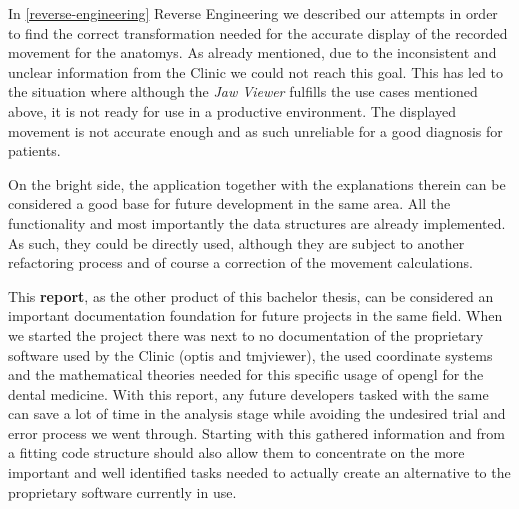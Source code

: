 In \ref{reverse-engineering} Reverse Engineering we described our attempts in order to find the correct transformation needed for the accurate display of the recorded movement for the \glspl{anatomy}. As already mentioned, due to the inconsistent and unclear information from the Clinic we could not reach this goal. This has led to the situation where although the \emph{Jaw Viewer} fulfills the use cases mentioned above, it is not ready for use in a productive environment. The displayed movement is not accurate enough and as such unreliable for a good diagnosis for patients.

On the bright side, the application together with the explanations therein can be considered a good base for future development in the same area. All the functionality and most importantly the data structures are already implemented. As such, they could be directly used, although they are subject to another refactoring process and of course a correction of the movement calculations. \newline

This \textbf{report}, as the other product of this bachelor thesis, can be considered an important documentation foundation for future projects in the same field. When we started the project there was next to no documentation of the proprietary software used by the Clinic (\gls{optis} and \gls{tmjviewer}), the used coordinate systems and the mathematical theories needed for this specific usage of \gls{opengl} for the dental medicine. With this report, any future developers tasked with the same can save a lot of time in the analysis stage while avoiding the undesired trial and error process we went through. Starting with this gathered information and from a fitting code structure should also allow them to concentrate on the more important and well identified tasks needed to actually create an alternative to the proprietary software currently in use.
